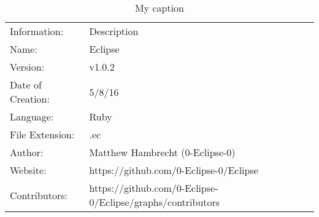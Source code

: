 \begin{table}[]
\centering
\caption{My caption}
\label{my-label}
\begin{tabular}{ll}
Information:      & Description                                                \\
Name:             & Eclipse                                                    \\
Version:          & v1.0.2                                                     \\
Date of Creation: & 5/8/16                                                     \\
Language:         & Ruby                                                       \\
File Extension:   & .ec                                                        \\
Author:           & Matthew Hambrecht (0-Eclipse-0)                            \\
Website:          & https://github.com/0-Eclipse-0/Eclipse                     \\
Contributors:     & https://github.com/0-Eclipse-0/Eclipse/graphs/contributors
\end{tabular}
\end{table}
